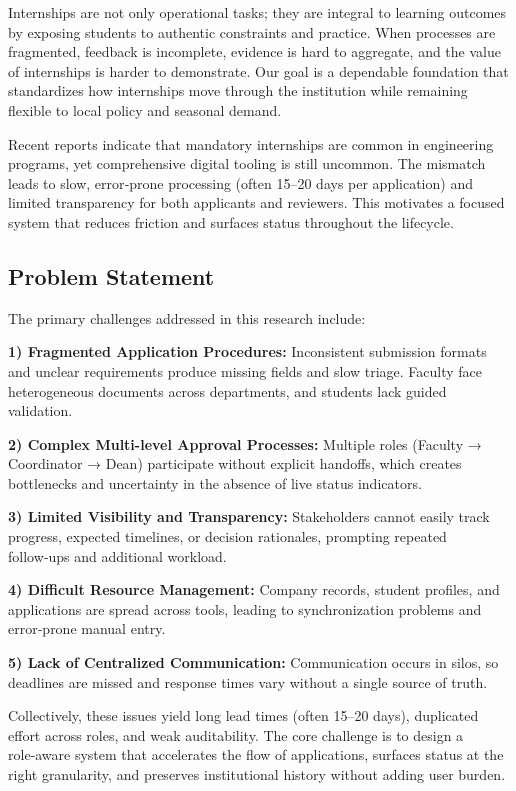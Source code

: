 \documentclass[conference]{IEEEtran}
\begin{document}
Internships are not only operational tasks; they are integral to learning outcomes by exposing students to authentic constraints and practice. When processes are fragmented, feedback is incomplete, evidence is hard to aggregate, and the value of internships is harder to demonstrate. Our goal is a dependable foundation that standardizes how internships move through the institution while remaining flexible to local policy and seasonal demand.

Recent reports indicate that mandatory internships are common in engineering programs, yet comprehensive digital tooling is still uncommon. The mismatch leads to slow, error‑prone processing (often 15–20 days per application) and limited transparency for both applicants and reviewers. This motivates a focused system that reduces friction and surfaces status throughout the lifecycle.

\subsection{Problem Statement}
The primary challenges addressed in this research include:

\textbf{1) Fragmented Application Procedures:} Inconsistent submission formats and unclear requirements produce missing fields and slow triage. Faculty face heterogeneous documents across departments, and students lack guided validation.

\textbf{2) Complex Multi-level Approval Processes:} Multiple roles (Faculty → Coordinator → Dean) participate without explicit handoffs, which creates bottlenecks and uncertainty in the absence of live status indicators.

\textbf{3) Limited Visibility and Transparency:} Stakeholders cannot easily track progress, expected timelines, or decision rationales, prompting repeated follow‑ups and additional workload.

\textbf{4) Difficult Resource Management:} Company records, student profiles, and applications are spread across tools, leading to synchronization problems and error‑prone manual entry.

\textbf{5) Lack of Centralized Communication:} Communication occurs in silos, so deadlines are missed and response times vary without a single source of truth.

Collectively, these issues yield long lead times (often 15–20 days), duplicated effort across roles, and weak auditability. The core challenge is to design a role‑aware system that accelerates the flow of applications, surfaces status at the right granularity, and preserves institutional history without adding user burden.
\end{document}
